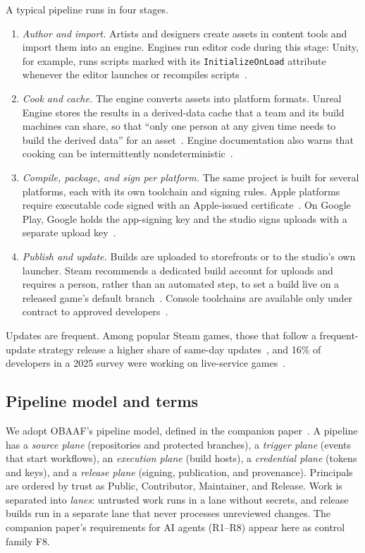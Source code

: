 \documentclass[acmsmall,screen,review]{acmart}
\providecommand{\code}[1]{\texttt{#1}}
\begin{document}
A typical pipeline runs in four stages.

\begin{enumerate}
\item \emph{Author and import.} Artists and designers create assets in content tools and import them into an engine. Engines run editor code during this stage: Unity, for example, runs scripts marked with its \code{InitializeOnLoad} attribute whenever the editor launches or recompiles scripts~\cite{unityndrunning}.
\item \emph{Cook and cache.} The engine converts assets into platform formats. Unreal Engine stores the results in a derived-data cache that a team and its build machines can share, so that ``only one person at any given time needs to build the derived data'' for an asset~\cite{epicndusing}. Engine documentation also warns that cooking can be intermittently nondeterministic~\cite{epicndc}.
\item \emph{Compile, package, and sign per platform.} The same project is built for several platforms, each with its own toolchain and signing rules. Apple platforms require executable code signed with an Apple-issued certificate~\cite{applendapp}. On Google Play, Google holds the app-signing key and the studio signs uploads with a separate upload key~\cite{googlenduse}.
\item \emph{Publish and update.} Builds are uploaded to storefronts or to the studio's own launcher. Steam recommends a dedicated build account for uploads and requires a person, rather than an automated step, to set a build live on a released game's default branch~\cite{valvenduploading}. Console toolchains are available only under contract to approved developers~\cite{godotndconsole}.
\end{enumerate}

Updates are frequent. Among popular Steam games, those that follow a frequent-update strategy release a higher share of same-day updates~\cite{lin2017studying}, and 16\% of developers in a 2025 survey were working on live-service games~\cite{game2025state}.


\subsection{Pipeline model and terms}\label{sec:2.3}

We adopt OBAAF's pipeline model, defined in the companion paper~\cite{keluoudeke2026untrusted}. A pipeline has a \emph{source plane} (repositories and protected branches), a \emph{trigger plane} (events that start workflows), an \emph{execution plane} (build hosts), a \emph{credential plane} (tokens and keys), and a \emph{release plane} (signing, publication, and provenance). Principals are ordered by trust as Public, Contributor, Maintainer, and Release. Work is separated into \emph{lanes}: untrusted work runs in a lane without secrets, and release builds run in a separate lane that never processes unreviewed changes. The companion paper's requirements for AI agents (R1–R8) appear here as control family F8.
\end{document}
